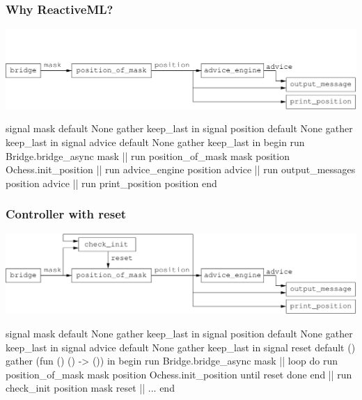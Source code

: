 \documentclass[t]{beamer}
\begin{document}
\begin{frame}[fragile]
\frametitle{Why ReactiveML?}

\includegraphics[scale=0.6]{figures/controller}

\begin{lstrml}
  signal mask default None gather keep_last in
  signal position default None gather keep_last in
  signal advice default None gather keep_last in
  begin
    run Bridge.bridge_async mask ||
    run position_of_mask mask position Ochess.init_position ||
    run advice_engine position advice ||
    run output_messages position advice ||
    run print_position position
  end
\end{lstrml}

\end{frame}


\begin{frame}[fragile]
\frametitle{Controller with reset}

\includegraphics[scale=0.6]{figures/controller-with-reset}

\begin{lstrml}
  signal mask default None gather keep_last in
  signal position default None gather keep_last in
  signal advice default None gather keep_last in
  signal reset default () gather (fun () () -> ()) in
  begin
    run Bridge.bridge_async mask ||
    loop
      do
        run position_of_mask mask position Ochess.init_position
      until reset done
    end ||
    run check_init position mask reset ||
    ...
  end
\end{lstrml}

\end{frame}


\end{document}
